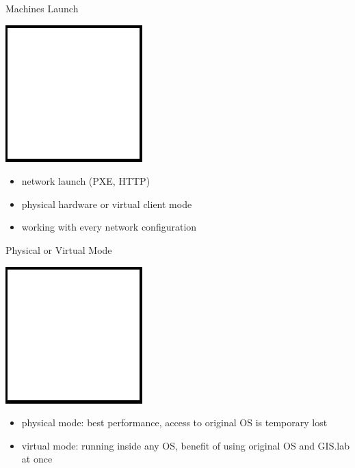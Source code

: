 \documentclass[12pt]{beamer}
\begin{document}
\begin{frame}{Machines Launch}
	\begin{center}
		\includegraphics[keepaspectratio=true,height=0.5\textheight]{images/image.png}
	\end{center}
	\begin{itemize}
		\item network launch (PXE, HTTP)
		\item physical hardware or virtual client mode
		\item working with every network configuration
	\end{itemize}
\end{frame}

\begin{frame}{Physical or Virtual Mode}
	\begin{center}
		\includegraphics[keepaspectratio=true,height=0.5\textheight]{images/image.png}
	\end{center}
	\begin{itemize}
		\item physical mode: best performance, access to original OS is temporary lost
		\item virtual mode: running inside any OS, benefit of using original OS and GIS.lab at once
	\end{itemize}
\end{frame}
\end{document}
